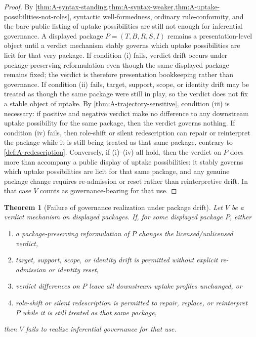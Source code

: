 \documentclass[11pt]{article}
\theoremstyle{plain}
\newtheorem{theorem}{Theorem}[section]
\theoremstyle{definition}
\begin{document}
\begin{proof}
By \cref{thm:A-syntax-standing,thm:A-syntax-weaker,thm:A-uptake-possibilities-not-roles}, syntactic well-formedness, ordinary rule-conformity, and the bare public listing of uptake possibilities are still not enough for inferential governance. A displayed package $P=(T,B,R,S,I)$ remains a presentation-level object until a verdict mechanism stably governs which uptake possibilities are licit for that very package. If condition (i) fails, verdict drift occurs under package-preserving reformulation even though the same displayed package remains fixed; the verdict is therefore presentation bookkeeping rather than governance. If condition (ii) fails, target, support, scope, or identity drift may be treated as though the same package were still in play, so the verdict does not fix a stable object of uptake. By \cref{thm:A-trajectory-sensitive}, condition (iii) is necessary: if positive and negative verdict make no difference to any downstream uptake possibility for the same package, then the verdict governs nothing. If condition (iv) fails, then role-shift or silent redescription can repair or reinterpret the package while it is still being treated as that same package, contrary to \cref{def:A-redescription}. Conversely, if (i)--(iv) all hold, then the verdict on $P$ does more than accompany a public display of uptake possibilities: it stably governs which uptake possibilities are licit for that same package, and any genuine package change requires re-admission or reset rather than reinterpretive drift. In that case $V$ counts as governance-bearing for that use.
\end{proof}


\begin{theorem}[Failure of governance realization under package drift]
\label{thm:A-drift-failure}
Let $V$ be a verdict mechanism on displayed packages. If, for some displayed package $P$, either
\begin{enumerate}[label=(\roman*), leftmargin=2.5em]
    \item a package-preserving reformulation of $P$ changes the licensed/unlicensed verdict,
    \item target, support, scope, or identity drift is permitted without explicit re-admission or identity reset,
    \item verdict differences on $P$ leave all downstream uptake profiles unchanged, or
    \item role-shift or silent redescription is permitted to repair, replace, or reinterpret $P$ while it is still treated as that same package,
\end{enumerate}
then $V$ fails to realize inferential governance for that use.
\end{theorem}
\end{document}
